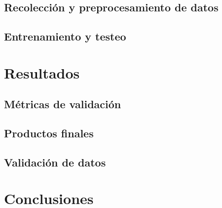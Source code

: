 \documentclass{beamer}
\begin{document}
  \subsection*{Recolección y preprocesamiento de datos}

  \begin{frame}
    \frametitle{}
  \end{frame}

  \subsection*{Entrenamiento y testeo}

  \begin{frame}
    \frametitle{}
  \end{frame}

  \section{Resultados}

  \subsection*{Métricas de validación}

  \begin{frame}
    \frametitle{}
  \end{frame}

  \subsection*{Productos finales}

  \begin{frame}
    \frametitle{}
  \end{frame}

  \subsection*{Validación de datos}

  \begin{frame}
    \frametitle{}
  \end{frame}

  \section{Conclusiones}

  \begin{frame}
    \frametitle{}
  \end{frame}
\end{document}
